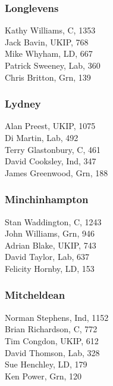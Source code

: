 \documentclass[a4paper,openany,10pt]{book}
\begin{document}
\subsubsection*{Longlevens}



Kathy Williams, C, 1353\\
Jack Bavin, UKIP, 768\\
Mike Whyham, LD, 667\\
Patrick Sweeney, Lab, 360\\
Chris Britton, Grn, 139\\


\subsubsection*{Lydney}



Alan Preest, UKIP, 1075\\
Di Martin, Lab, 492\\
Terry Glastonbury, C, 461\\
David Cooksley, Ind, 347\\
James Greenwood, Grn, 188\\


\subsubsection*{Minchinhampton}



Stan Waddington, C, 1243\\
John Williams, Grn, 946\\
Adrian Blake, UKIP, 743\\
David Taylor, Lab, 637\\
Felicity Hornby, LD, 153\\


\subsubsection*{Mitcheldean}



Norman Stephens, Ind, 1152\\
Brian Richardson, C, 772\\
Tim Congdon, UKIP, 612\\
David Thomson, Lab, 328\\
Sue Henchley, LD, 179\\
Ken Power, Grn, 120\\
\end{document}
